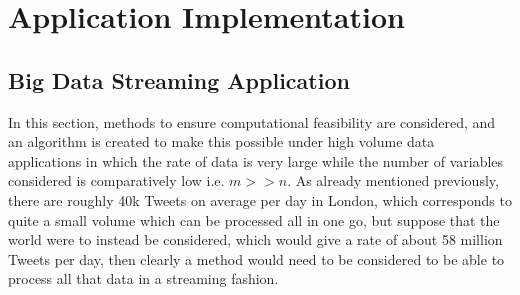\documentclass[11pt,a4paper]{article}
\begin{document}
\section{Application Implementation}

\subsection{Big Data Streaming Application}
In this section, methods to ensure computational feasibility are considered, and an algorithm is created to make this possible under high volume data applications in which the rate of data is very large while the number of variables considered is comparatively low i.e. $m >> n$. As already mentioned previously, there are roughly 40k Tweets on average per day in London, which corresponds to quite a small volume which can be processed all in one go, but suppose that the world were to instead be considered, which would give a rate of about 58 million Tweets per day, then clearly a method would need to be considered to be able to process all that data in a streaming fashion. 
\end{document}
